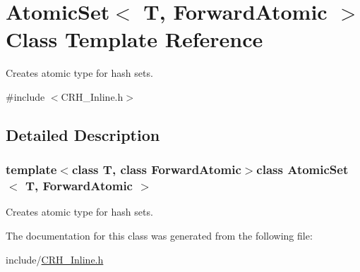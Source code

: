 \hypertarget{class_atomic_set}{}\section{Atomic\+Set$<$ T, Forward\+Atomic $>$ Class Template Reference}
\label{class_atomic_set}


Creates atomic type for hash sets.  




{\ttfamily \#include $<$C\+R\+H\+\_\+\+Inline.\+h$>$}



\subsection{Detailed Description}
\subsubsection*{template$<$class T, class Forward\+Atomic$>$class Atomic\+Set$<$ T, Forward\+Atomic $>$}

Creates atomic type for hash sets. 

The documentation for this class was generated from the following file\+:\begin{DoxyCompactItemize}
\item 
include/\hyperlink{_c_r_h___inline_8h}{C\+R\+H\+\_\+\+Inline.\+h}\end{DoxyCompactItemize}

